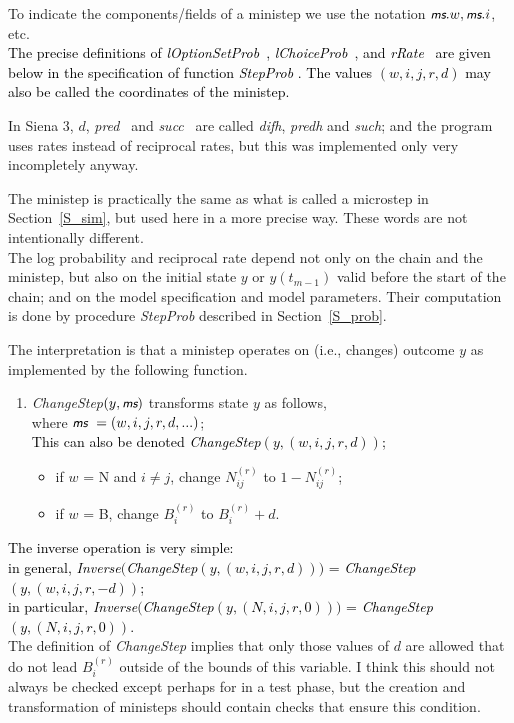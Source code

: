 \documentclass[a4paper,12pt,fleqn]{article}
\newcommand{\nnm}[1]{\textsf{\small\textit{#1}\ }}
\newcommand{\ms}{\textsl{\textsf{\small ms}}} %
\newcommand{\addc}[1]{{\textcolor[named]{Black}{#1}}}  %
\newcommand{\addaa}[1]{{\textcolor[named]{Black}{#1}}}  %
\newcommand{\addca}[1]{{\textcolor[named]{Black}{#1}}}  %
\begin{document}
To indicate the components/fields of a ministep we use the notation
$\ms.w, \ms.i$, etc.\\
\addc{The precise definitions of \nnm{lOptionSetProb}, \nnm{lChoiceProb},
and \nnm{rRate} are
given below in the specification of function \textit{StepProb }.}
\addca{The values $(w,i,j,r,d)$ may also be called the coordinates of the ministep.}

In Siena 3, $d$, \nnm{pred} and \nnm{succ} are called \textit{difh},
\textit{predh} and \textit{such};
and the program uses rates instead of reciprocal rates, but this was
implemented only very incompletely anyway.

The ministep is practically the same as what is called a microstep
in Section~\ref{S_sim}, but used here in a more
precise way. These words are not intentionally different.
\\
The log probability and reciprocal rate depend not only on the
chain and the ministep, but also on the initial state $y$ or $y(t_{m-1})$
valid before the start of the chain; and on the model specification and
model parameters.
Their computation is done by procedure \textit{StepProb} described in
Section~\ref{S_prob}.

The interpretation is that a ministep operates on (i.e., changes)
outcome $y$ as implemented by the following function.
\begin{enumerate}
\item \textit{ChangeStep}$(y, \ms)$  transforms state $y$ as follows,\\
      where $ \ms \ = (w,i,j,r,d, ...)$;\\
      \addaa{This can also be denoted  \textit{ChangeStep}$(y, (w,i,j,r,d))$;}
      \begin{itemize}
      \item if $w$ = N and $i \neq j$, change $N^{(r)}_{ij}$ to $1 - N^{(r)}_{ij}$;
      \item if $w$ = B,  change $B^{(r)}_{i}$ to $B^{(r)}_{i} + d$.
      \end{itemize}
\end{enumerate}
\addca{The inverse operation is very simple:\\
in general, \textit{Inverse$\big($ChangeStep}$(y, (w,i,j,r,d))\big)$ =
             \textit{ChangeStep}$(y, (w,i,j,r,-d))$;\\
in particular, \textit{Inverse$\big($ChangeStep}$(y, (N,i,j,r,0))\big)$ =
                 \textit{ChangeStep}$(y, (N,i,j,r,0))$.}\\
The definition of \textit{ChangeStep}
implies that only those values of $d$ are allowed that do not lead
$B^{(r)}_{i}$ outside of the bounds of this variable.
I think this should not always be checked except perhaps for in a test phase,
but the creation and transformation of ministeps should contain
checks that ensure this condition.
\end{document}
